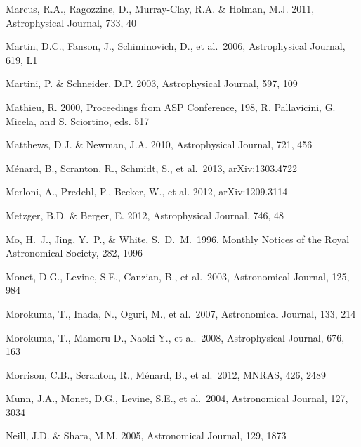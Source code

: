 \documentclass[twocolumn]{aastex61}
\begin{document}
\begin{thebibliography}{}
 Marcus, R.A., Ragozzine, D., Murray-Clay, R.A. \& Holman, M.J. 2011, Astrophysical Journal, 733, 40

 Martin, D.C., Fanson, J., Schiminovich, D., et al.~2006, Astrophysical Journal, 619, L1

 Martini, P. \& Schneider, D.P. 2003, Astrophysical Journal, 597, 109

 Mathieu, R. 2000, Proceedings from ASP Conference, 198, R. Pallavicini, G. Micela, and S. Sciortino, eds. 517

 Matthews, D.J. \& Newman, J.A. 2010, Astrophysical Journal, 721, 456

 M\'{e}nard, B., Scranton, R., Schmidt, S., et al.~2013, arXiv:1303.4722

 Merloni, A., Predehl, P., Becker, W., et al. 2012, arXiv:1209.3114

 Metzger, B.D. \& Berger, E. 2012, Astrophysical Journal, 746, 48

 Mo, H.~J., Jing, Y.~P., \& White, S.~D.~M.\ 1996, Monthly Notices of the Royal Astronomical Society, 282, 1096

 Monet, D.G., Levine, S.E., Canzian, B., et al.~2003, Astronomical Journal, 125, 984

 Morokuma, T., Inada, N., Oguri, M., et al.~2007, Astronomical Journal, 133, 214

 Morokuma, T., Mamoru D., Naoki Y., et al.~2008, Astrophysical Journal, 676, 163

 Morrison, C.B., Scranton, R., M\'{e}nard, B., et al.~2012, MNRAS, 426, 2489

 Munn, J.A., Monet, D.G., Levine, S.E., et al.~2004, Astronomical Journal, 127, 3034

 Neill, J.D. \& Shara, M.M. 2005, Astronomical Journal, 129, 1873


\end{thebibliography}
\end{document}
